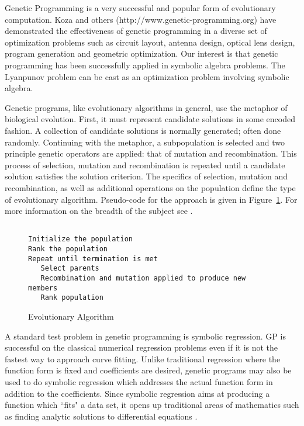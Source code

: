 \documentclass[12pt]{article}
\begin{document}
Genetic Programming is a very successful and popular form of
evolutionary computation.  Koza and others (http://www.genetic-programming.org) have
demonstrated the effectiveness of genetic programming in a diverse set
of optimization problems such as circuit layout, antenna design,
optical lens design, program generation and geometric optimization.
Our interest is that genetic programming has been successfully applied
in symbolic algebra problems.  The Lyanpunov problem can be cast as an
optimization problem involving symbolic algebra.


Genetic programs, like evolutionary algorithms in general, use the
metaphor of biological evolution.  First, it must represent candidate
solutions in some encoded fashion.  A collection of candidate
solutions is normally generated; often done randomly.  Continuing with
the metaphor, a subpopulation is selected and two principle genetic
operators are applied: that of mutation and recombination.  This
process of selection, mutation and recombination is repeated until a
candidate solution satisfies the solution criterion.  The specifics of
selection, mutation and recombination, as well as additional
operations on the population define the type of evolutionary
algorithm. Pseudo-code for the approach is given in
Figure~\ref{evoalg}.  For more information on the breadth of the
subject see \cite{banzhaf:1997:book, fogel:1998:ecfr,
  goldberg:1988:gaml}.


\begin{figure}[tbh]
{\color{blue}
\begin{verbatim}

Initialize the population
Rank the population
Repeat until termination is met
   Select parents
   Recombination and mutation applied to produce new members
   Rank population
\end{verbatim}
}
\caption{Evolutionary Algorithm\label{evoalg}}
\end{figure}


A standard test problem in genetic programming is symbolic regression.
GP is successful on the classical numerical regression problems even
if it is not the fastest way to approach curve fitting.  Unlike
traditional regression where the function form is fixed and
coefficients are desired, genetic programs may also be used to do
symbolic regression which addresses the actual function form in
addition to the coefficients.  Since symbolic regression aims at
producing a function which ``fits" a data set, it opens up traditional
areas of mathematics such as finding analytic solutions to
differential equations \cite{burgess:1999:faasdeGP, koza:book}.
\end{document}
